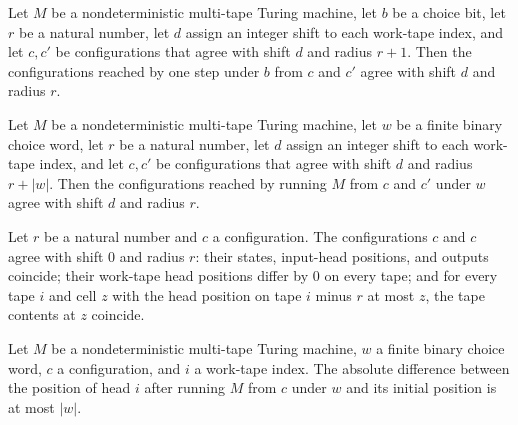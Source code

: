 \begin{theorem}
\label{Turing.NDTM.AgreeShift.stepWith}
\leanok
{}
Let $M$ be a nondeterministic multi-tape Turing machine, let $b$ be a choice bit, let
$r$ be a natural number, let $d$ assign an integer shift to each work-tape index, and
let $c,c'$ be configurations that agree with shift $d$ and radius $r+1$. Then the
configurations reached by one step under $b$ from $c$ and $c'$ agree with shift $d$ and
radius $r$.
\end{theorem}

\begin{theorem}
\label{Turing.NDTM.AgreeShift.runWith}
\leanok
{}
Let $M$ be a nondeterministic multi-tape Turing machine, let $w$ be a finite binary
choice word, let $r$ be a natural number, let $d$ assign an integer shift to each
work-tape index, and let $c,c'$ be configurations that agree with shift $d$ and radius
$r+|w|$. Then the configurations reached by running $M$ from $c$ and $c'$ under $w$
agree with shift $d$ and radius $r$.
\end{theorem}

\begin{theorem}
\label{Turing.NDTM.AgreeShift.refl}
\leanok
{}
Let $r$ be a natural number and $c$ a configuration. The configurations $c$ and $c$
agree with shift $0$ and radius $r$: their states, input-head positions, and outputs
coincide; their work-tape head positions differ by $0$ on every tape; and for every tape
$i$ and cell $z$ with the head position on tape $i$ minus $r$ at most $z$, the tape
contents at $z$ coincide.
\end{theorem}

\begin{theorem}
\label{Turing.NDTM.abs_runWith_workTapePos_sub_le}
\leanok
{}
Let $M$ be a nondeterministic multi-tape Turing machine, $w$ a finite binary choice
word, $c$ a configuration, and $i$ a work-tape index. The absolute difference between
the position of head $i$ after running $M$ from $c$ under $w$ and its initial position
is at most $|w|$.
\end{theorem}

